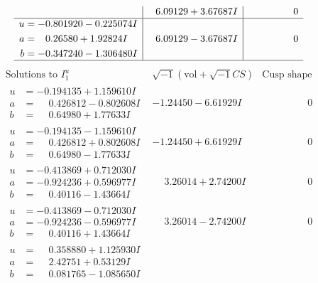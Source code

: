 \documentclass[1p]{elsarticle_modified}
\theoremstyle{definition}
\newcommand{\I}{\sqrt{-1}}
\begin{document}
$$\begin{array}{c|c|c}
 & \phantom{-}6.09129 + 3.67687 I & \phantom{-0.000000 } 0 \\ \hline\begin{aligned}
u &= -0.801920 - 0.225074 I \\
a &= \phantom{-}0.26580 + 1.92824 I \\
b &= -0.347240 - 1.306480 I\end{aligned}
 & \phantom{-}6.09129 - 3.67687 I & \phantom{-0.000000 } 0\\
 \hline 
 \end{array}$$\newpage$$\begin{array}{c|c|c}  
\text{Solutions to }I^u_{1}& \I (\text{vol} + \sqrt{-1}CS) & \text{Cusp shape}\\
 \hline 
\begin{aligned}
u &= -0.194135 + 1.159610 I \\
a &= \phantom{-}0.426812 - 0.802608 I \\
b &= \phantom{-}0.64980 + 1.77633 I\end{aligned}
 & -1.24450 - 6.61929 I & \phantom{-0.000000 } 0 \\ \hline\begin{aligned}
u &= -0.194135 - 1.159610 I \\
a &= \phantom{-}0.426812 + 0.802608 I \\
b &= \phantom{-}0.64980 - 1.77633 I\end{aligned}
 & -1.24450 + 6.61929 I & \phantom{-0.000000 } 0 \\ \hline\begin{aligned}
u &= -0.413869 + 0.712030 I \\
a &= -0.924236 + 0.596977 I \\
b &= \phantom{-}0.40116 - 1.43664 I\end{aligned}
 & \phantom{-}3.26014 + 2.74200 I & \phantom{-0.000000 } 0 \\ \hline\begin{aligned}
u &= -0.413869 - 0.712030 I \\
a &= -0.924236 - 0.596977 I \\
b &= \phantom{-}0.40116 + 1.43664 I\end{aligned}
 & \phantom{-}3.26014 - 2.74200 I & \phantom{-0.000000 } 0 \\ \hline\begin{aligned}
u &= \phantom{-}0.358880 + 1.125930 I \\
a &= \phantom{-}2.42751 + 0.53129 I \\
b &= \phantom{-}0.081765 - 1.085650 I\end{aligned}

\end{array}$$
\end{document}
